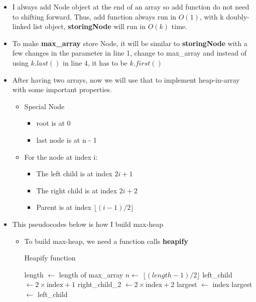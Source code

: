\documentclass{article}
\begin{document}
\begin{itemize}
		\item I always add Node object at the end of an array so add function do not need to shifting forward. Thus, add function always run in \(O(1)\), with k doubly-linked list object, \textbf{storingNode} will run in \(O(k)\) time.
		\item To make \textbf{max\_array} store Node, it will be similar to \textbf{storingNode} with a few changes in the parameter in line 1, change to max\_array and instead of using \(k.last()\) in line 4, it has to be \(k.first()\)
		\item After having two arrays, now we will use that to implement heap-in-array with some important properties.
		\begin{itemize}
			\item Special Node
			\begin{itemize}
				\item root is at 0
				\item last node is at n - 1
			\end{itemize}
			\item For the node at index i:
			\begin{itemize}
				\item The left child is at index \(2i + 1\)
				\item The right child is at index \(2i + 2\)
				\item Parent is at index \( \lfloor (i - 1) / 2 \rfloor\)
			\end{itemize}
		\end{itemize}
		\item This pseudocodes below is how I build max-heap
		\begin{itemize}
			\item To build max-heap, we need a function calls \textbf{heapify}
			\begin{algorithm}[H]
				\caption{Heapify function}
			\begin{algorithmic}[1]
				\State length \(\gets\) length of max\_array
				\State \(n \gets\) \( \lfloor (length - 1) / 2 \rfloor\) 
					\State {} 
				\EndIf{}
				\State left\_child \(\leftarrow 2 \times \text{index} + 1\) 
				\State right\_child\_2 \(\leftarrow 2 \times \text{index} + 2\) 
				\State largest \(\gets\) index
					\State largest \(\gets\) left\_child
				\EndIf{}


\end{algorithmic}
\end{algorithm}
\end{itemize}
\end{itemize}
\end{document}
